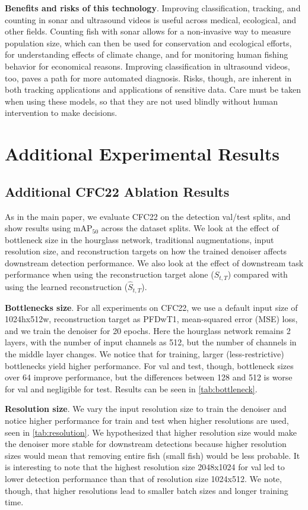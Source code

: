 \textbf{Benefits and risks of this technology}. Improving classification, tracking, and counting in sonar and ultrasound videos is useful across medical, ecological, and other fields. Counting fish with sonar allows for a non-invasive way to measure population size, which can then be used for conservation and ecological efforts, for understanding effects of climate change, and for monitoring human fishing behavior for economical reasons. Improving classification in ultrasound videos, too, paves a path for more automated diagnosis. Risks, though, are inherent in both tracking applications and applications of sensitive data. Care must be taken when using these models, so that they are not used blindly without human intervention to make decisions.

\section{Additional Experimental Results}\label{sec:ablations}

\subsection{Additional CFC22 Ablation Results}\label{sec:ablation_additions}

As in the main paper, we evaluate CFC22 on the detection val/test splits, and show results using mAP$_{50}$ across the dataset splits. We look at the effect of bottleneck size in the hourglass network, traditional augmentations, input resolution size, and reconstruction targets on how the trained denoiser affects downstream detection performance. We also look at the effect of downstream task performance when using the reconstruction target alone ($S_{t,T}$) compared with using the learned reconstruction ($\hat{S}_{t,T}$).

\textbf{Bottlenecks size}. For all experiments on CFC22, we use a default input size of 1024hx512w, reconstruction target as PFDwT1, mean-squared error (MSE) loss, and we train the denoiser for 20 epochs. Here the hourglass network remains 2 layers, with the number of input channels as 512, but the number of channels in the middle layer changes. We notice that for training, larger (less-restrictive) bottlenecks yield higher performance. For val and test, though, bottleneck sizes over 64 improve performance, but the differences between 128 and 512 is worse for val and negligible for test. Results can be seen in \cref{tab:bottleneck}.

\textbf{Resolution size}. We vary the input resolution size to train the denoiser and notice higher performance for train and test when higher resolutions are used, seen in \cref{tab:resolution}. We hypothesized that higher resolution size would make the denoiser more stable for downstream detections because higher resolution sizes would mean that removing entire fish (\ie small fish) would be less probable. It is interesting to note that the highest resolution size 2048x1024 for val led to lower detection performance than that of resolution size 1024x512. We note, though, that higher resolutions lead to smaller batch sizes and longer training time.

